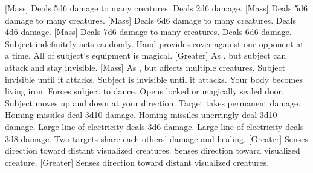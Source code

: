 [Mass]
    {Deals 5d6 damage to many creatures.}
    {Deals 2d6 damage.}
    {[Mass] Deals 5d6 damage to many creatures.}
[Mass]
    {Deals 6d6 damage to many creatures.}
    {Deals 4d6 damage.}
[Mass]
    {Deals 7d6 damage to many creatures.}
    {Deals 6d6 damage.}
    {Subject indefinitely acts randomly.}
    {Hand provides cover against one opponent at a time.}
    {All of subject's equipment is magical.}
[Greater]
    {As , but subject can attack and stay invisible.}
[Mass]
    {As , but affects multiple creatures.}
    {Subject invisible until it attacks.}
    {Subject is invisible until it attacks.}
    {Your body becomes living iron.}
    {Forces subject to dance.}
    {Opens locked or magically sealed door.}
    {Subject moves up and down at your direction.}
    {Target takes permanent damage.}
    {Homing missiles deal 3d10 damage.}
    {Homing missiles unerringly deal 3d10 damage.}
    {Large line of electricity deals 3d6 damage.}
    {Large line of electricity deals 3d8 damage.}
    {Two targets share each others' damage and healing.}
[Greater]
    {Senses direction toward distant visualized creatures.}
    {Senses direction toward visualized creature.}
    {[Greater] Senses direction toward distant visualized creatures.}
